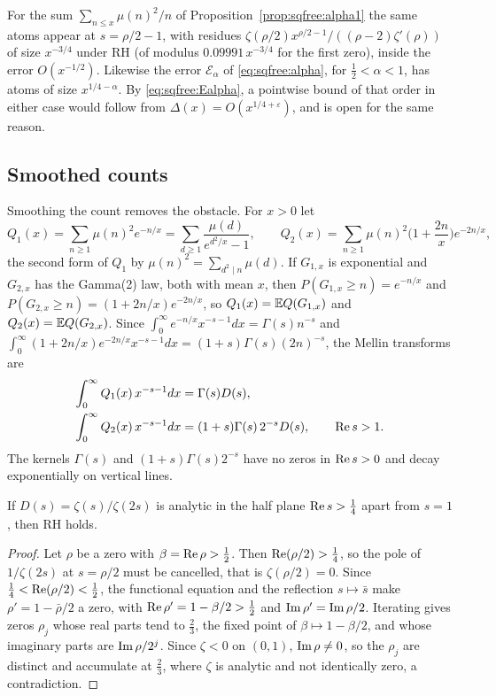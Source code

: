 For the sum $\sum_{n\le x}\mu(n)^2/n$ of Proposition~\ref{prop:sqfree:alpha1} the same atoms appear at $s=\rho/2-1$, with residues $\zeta(\rho/2)x^{\rho/2-1}/((\rho-2)\zeta'(\rho))$ of size $x^{-3/4}$ under RH (of modulus $0.09991\,x^{-3/4}$ for the first zero), inside the error $O(x^{-1/2})$. Likewise the error $\mathcal E_\alpha$ of \eqref{eq:sqfree:alpha}, for $\frac12<\alpha<1$, has atoms of size $x^{1/4-\alpha}$. By \eqref{eq:sqfree:Ealpha}, a pointwise bound of that order in either case would follow from $\Delta(x)=O(x^{1/4+\varepsilon})$, and is open for the same reason.

\subsection{Smoothed counts}\label{sec:sqfree:smooth}

Smoothing the count removes the obstacle. For $x>0$ let
\[
Q_1(x)=\sum_{n\ge1}\mu(n)^2e^{-n/x}=\sum_{d\ge1}\frac{\mu(d)}{e^{d^2/x}-1},\qquad Q_2(x)=\sum_{n\ge1}\mu(n)^2\Big(1+\frac{2n}x\Big)e^{-2n/x},
\]
the second form of $Q_1$ by $\mu(n)^2=\sum_{d^2\mid n}\mu(d)$. If $G_{1,x}$ is exponential and $G_{2,x}$ has the Gamma(2) law, both with mean $x$, then $P(G_{1,x}\ge n)=e^{-n/x}$ and $P(G_{2,x}\ge n)=(1+2n/x)e^{-2n/x}$, so $Q_1(x)=\mathbb{E} Q(G_{1,x})$ and $Q_2(x)=\mathbb{E} Q(G_{2,x})$. Since $\int_0^\infty e^{-n/x}x^{-s-1}dx=\Gamma(s)n^{-s}$ and $\int_0^\infty(1+2n/x)e^{-2n/x}x^{-s-1}dx=(1+s)\Gamma(s)(2n)^{-s}$, the Mellin transforms are
\begin{equation}\label{eq:sqfree:mellin12}
\begin{aligned}
\int_0^\infty Q_1(x)\,x^{-s-1}dx&=\Gamma(s)D(s),\\
\int_0^\infty Q_2(x)\,x^{-s-1}dx&=(1+s)\Gamma(s)\,2^{-s}D(s),\qquad\operatorname{Re} s>1 .
\end{aligned}
\end{equation}
The kernels $\Gamma(s)$ and $(1+s)\Gamma(s)2^{-s}$ have no zeros in $\operatorname{Re} s>0$ and decay exponentially on vertical lines.

\begin{lemma}\label{lem:sqfree:descent}
If $D(s)=\zeta(s)/\zeta(2s)$ is analytic in the half plane $\operatorname{Re} s>\frac14$ apart from $s=1$, then RH holds.
\end{lemma}

\begin{proof}
Let $\rho$ be a zero with $\beta=\operatorname{Re}\rho>\frac12$. Then $\operatorname{Re}(\rho/2)>\frac14$, so the pole of $1/\zeta(2s)$ at $s=\rho/2$ must be cancelled, that is $\zeta(\rho/2)=0$. Since $\frac14<\operatorname{Re}(\rho/2)<\frac12$, the functional equation and the reflection $s\mapsto\bar s$ make $\rho'=1-\bar\rho/2$ a zero, with $\operatorname{Re}\rho'=1-\beta/2>\frac12$ and $\operatorname{Im}\rho'=\operatorname{Im}\rho/2$. Iterating gives zeros $\rho_j$ whose real parts tend to $\frac23$, the fixed point of $\beta\mapsto1-\beta/2$, and whose imaginary parts are $\operatorname{Im}\rho/2^j$. Since $\zeta<0$ on $(0,1)$, $\operatorname{Im}\rho\ne0$, so the $\rho_j$ are distinct and accumulate at $\frac23$, where $\zeta$ is analytic and not identically zero, a contradiction.
\end{proof}

